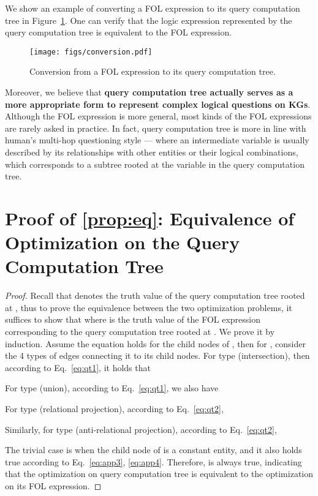 We show an example of converting a FOL expression to its query computation tree in Figure~\ref{fig:conversion}. One can verify that the logic expression represented by the query computation tree is equivalent to the FOL expression.

\begin{figure}[htbp]
\centering
\texttt{[image: figs/conversion.pdf]}
\caption{Conversion from a FOL expression to its query computation tree.}
\label{fig:conversion}
\end{figure}

Moreover, we believe that \textbf{query computation tree actually serves as a more appropriate form to represent complex logical questions on KGs}.
Although the FOL expression is more general, most kinds of the FOL expressions are rarely asked in practice.
In fact, query computation tree is more in line with human's multi-hop questioning style --- where an intermediate variable is usually described by its relationships with other entities or their logical combinations, which corresponds to a subtree rooted at the variable in the query computation tree.

\section{Proof of \cref{prop:eq}: Equivalence of Optimization on the Query Computation Tree}
\label{app:prop}

\prop*
\begin{proof}
    Recall that  denotes the truth value of the query computation tree rooted at , thus to prove the equivalence between the two optimization problems, it suffices to show that  where  is the truth value of the FOL expression corresponding to the query computation tree rooted at .
    We prove it by induction. Assume the equation holds for the child nodes of , then for , consider the 4 types of edges connecting it to its child nodes.
    For type  (intersection), then according to Eq.~\ref{eq:qt1}, it holds that
    
    For type  (union), according to Eq.~\ref{eq:qt1}, we also have
    
    For type  (relational projection), according to Eq.~\ref{eq:qt2},
    
    Similarly, for type  (anti-relational projection), according to Eq.~\ref{eq:qt2},
    
The trivial case is when the child node of  is a constant entity, and it also holds true according to Eq.~\ref{eq:app3}, \ref{eq:app4}.
Therefore,  is always true, indicating that the optimization on query computation tree is equivalent to the optimization on its FOL expression.
\end{proof}

